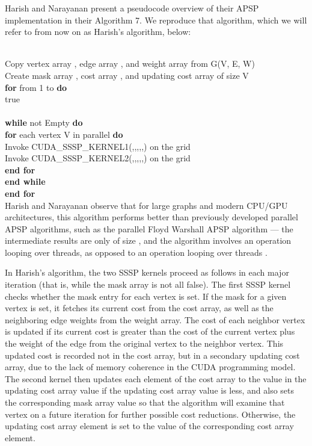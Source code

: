 \documentclass[copyright]{eptcs}
\begin{document}
Harish and Narayanan \cite{Harish2007} present a pseudocode overview
of their APSP implementation in their Algorithm 7.  We reproduce that 
algorithm, which we will refer to from now on as Harish's algorithm, below:

\noindent
\\
Copy vertex array , edge array , and weight array 
from G(V, E, W)\\
Create mask array , cost array , and updating cost array 
 of size V\\
\textbf{for}  from 1 to  \textbf{do}\\
\indent[S]  true\\
\\
\indent \textbf{while}  not Empty \textbf{do}\\
\indent\indent \textbf{for} each vertex V in parallel \textbf{do}\\
\indent\indent\indent Invoke CUDA\_SSSP\_KERNEL1(,,,,,) on the grid\\
\indent\indent\indent Invoke CUDA\_SSSP\_KERNEL2(,,,,,) on the grid\\
\indent\indent  \textbf{end for}\\
\indent \textbf{end while}\\
\textbf{end for}\\

Harish and Narayanan observe that for large graphs and modern CPU/GPU
architectures, this algorithm performs better than previously 
developed parallel APSP algorithms, such as the parallel Floyd
Warshall APSP algorithm --- the intermediate results are only of size
, and the algorithm involves an  operation looping over 
 threads, as opposed to an  operation looping over 
 threads \cite{Harish2007}.

In Harish's algorithm, the two SSSP kernels proceed as follows in each
major iteration (that is, while the mask array is not all false).  
The first SSSP kernel checks whether the mask entry for each vertex is set.  
If the mask for a given vertex is set, it fetches its current cost from the
cost array, as well as the neighboring edge weights from the weight
array.  The cost of each neighbor vertex is updated if its current
cost is greater than the cost of the current vertex plus the weight 
of the edge from the original vertex to the neighbor vertex.  
This updated cost is recorded not in the cost array, but in a
secondary updating cost array, due to the lack of memory coherence 
in the CUDA programming model.  The second kernel then updates 
each element of the cost array to the value in the updating cost array 
value if the updating cost array value is less, and also sets the 
corresponding mask array value so that the algorithm will examine 
that vertex on a future iteration for further possible cost
reductions.  Otherwise, the updating cost array element is set to 
the value of the corresponding cost array element.
\end{document}
